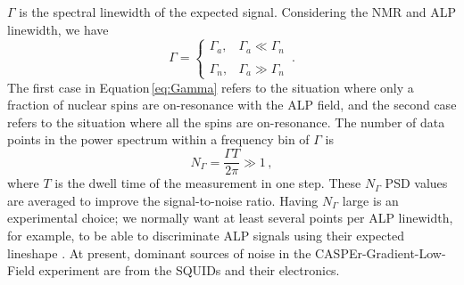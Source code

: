 $\Gamma$ is the spectral linewidth of the expected signal. Considering the NMR and ALP linewidth, we have
\begin{equation}
    \Gamma = \left\{
    \begin{array}{cl}
    \Gamma_a ,
    &  \Gamma_a \ll \Gamma_{n}\\
    \,& \\
    \Gamma_{n},
    & \Gamma_a  \gg \Gamma_{n}
    \end{array} \right.
    \,.\label{eq:Gamma}
\end{equation}
The first case in Equation\,\eqref{eq:Gamma} refers to the situation where only a fraction of nuclear spins are on-resonance with the ALP field, and the second case refers to the situation where all the spins are on-resonance. 
The number of data points in the power spectrum within a frequency bin of $\Gamma$ is
\begin{equation}
    N_{\Gamma} = \dfrac{\Gamma T}{2\pi} \gg 1
    \,,\label{eq:NGamma}
\end{equation}
where $T$ is the dwell time of the measurement in one step. 
These $N_{\Gamma}$ PSD values are averaged to improve the signal-to-noise ratio. Having $N_{\Gamma}$ large is an experimental choice; we normally want at least several points per ALP linewidth, for example, to be able to discriminate ALP signals using their expected lineshape \cite{Gramolin2022_SpectralPhysRevD}.
At present, dominant sources of noise in the CASPEr-Gradient-Low-Field experiment are from the SQUIDs and their electronics. 
